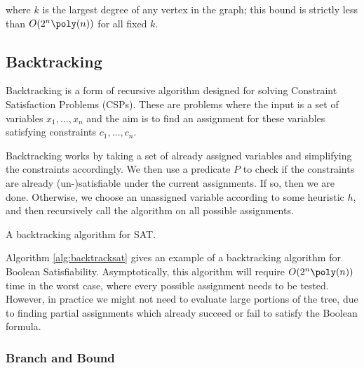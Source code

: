 \noindent where $k$ is the largest degree of any vertex in the graph; this bound is strictly less than $O(2^n\poly(n))$ for all fixed $k$.

\subsection{Backtracking}

Backtracking is a form of recursive algorithm designed for solving Constraint Satisfaction Problems (CSPs). These are problems where the input is a set of variables $x_1,\dots,x_n$ and the aim is to find an assignment for these variables satisfying constraints $c_1,\dots,c_n$.

Backtracking works by taking a set of already assigned variables and simplifying the constraints accordingly. We then use a predicate $P$ to check if the constraints are already (un-)satisfiable under the current assignments. If so, then we are done. Otherwise, we choose an unassigned variable according to some heuristic $h$, and then recursively call the algorithm on all possible assignments.

\begin{algorithm}
\caption{\label{alg:backtracksat} A backtracking algorithm for SAT.}
\end{algorithm}

Algorithm \ref{alg:backtracksat} gives an example of a backtracking algorithm for Boolean Satisfiability. Asymptotically, this algorithm will require $O(2^n\poly(n))$ time in the worst case, where every possible assignment needs to be tested. However, in practice we might not need to evaluate large portions of the tree, due to finding partial assignments which already succeed or fail to satisfy the Boolean formula.

\subsubsection{Branch and Bound}

